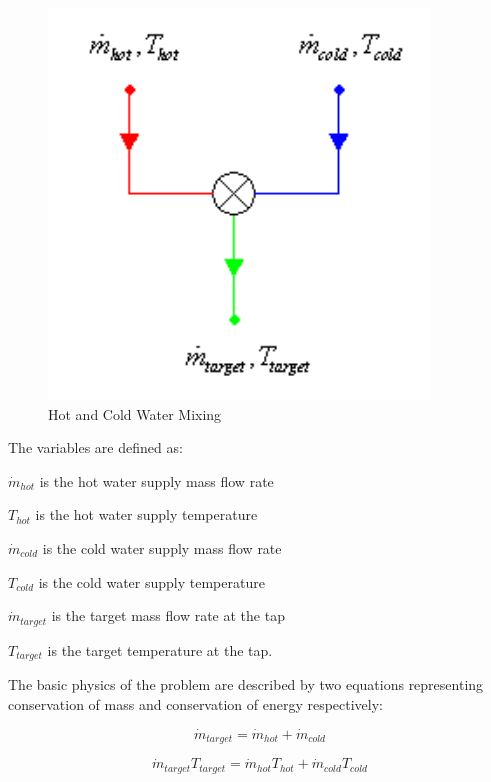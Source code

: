 \begin{figure}[hbtp] %
\centering
\includegraphics[width=0.9\textwidth, height=0.9\textheight, keepaspectratio=true]{media/image6937.png}
\caption{Hot and Cold Water Mixing \protect \label{fig:hot-and-cold-water-mixing}}
\end{figure}

The variables are defined as:

\({\dot m_{hot}}\) is the hot water supply mass flow rate

\({T_{hot}}\) is the hot water supply temperature

\({\dot m_{cold}}\) is the cold water supply mass flow rate

\({T_{cold}}\) is the cold water supply temperature

\({\dot m_{target}}\) is the target mass flow rate at the tap

\({T_{target}}\) is the target temperature at the tap.

The basic physics of the problem are described by two equations representing conservation of mass and conservation of energy respectively:

\begin{equation}
{\dot m_{target}} = {\dot m_{hot}} + {\dot m_{cold}}
\end{equation}

\begin{equation}
{\dot m_{target}}{T_{target}} = {\dot m_{hot}}{T_{hot}} + {\dot m_{cold}}{T_{cold}}
\end{equation}

